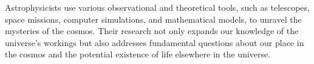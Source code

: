 Astrophysicists use various observational and theoretical tools, such as telescopes, space missions, computer simulations, and mathematical models, to unravel the mysteries of the cosmos. Their research not only expands our knowledge of the universe's workings but also addresses fundamental questions about our place in the cosmos and the potential existence of life elsewhere in the universe.